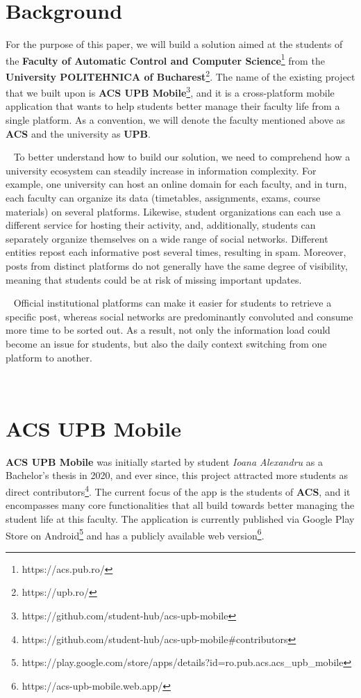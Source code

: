 \section{Background} \label{1:background}

For the purpose of this paper, we will build a solution aimed at the students of the \textbf{Faculty of Automatic Control and Computer Science}\footnote{https://acs.pub.ro/} from the \textbf{University POLITEHNICA of Bucharest}\footnote{https://upb.ro/}. The name of the existing project that we built upon is \textbf{ACS UPB Mobile}\footnote{https://github.com/student-hub/acs-upb-mobile}, and it is a cross-platform mobile application that wants to help students better manage their faculty life from a single platform. As a convention, we will denote the faculty mentioned above as \textbf{ACS} and the university as \textbf{UPB}. 

~
To better understand how to build our solution, we need to comprehend how a university ecosystem can steadily increase in information complexity. For example, one university can host an online domain for each faculty, and in turn, each faculty can organize its data (timetables, assignments, exams, course materials) on several platforms. Likewise, student organizations can each use a different service for hosting their activity, and, additionally, students can separately organize themselves on a wide range of social networks. Different entities repost each informative post several times, resulting in spam. Moreover, posts from distinct platforms do not generally have the same degree of visibility, meaning that students could be at risk of missing important updates.

~
Official institutional platforms can make it easier for students to retrieve a specific post, whereas social networks are predominantly convoluted and consume more time to be sorted out. As a result, not only the information load could become an issue for students, but also the daily context switching from one platform to another.

~

\section{ACS UPB Mobile} \label{1:acs-upb-mobile}

\textbf{ACS UPB Mobile} was initially started by student \textit{Ioana Alexandru} as a Bachelor's thesis \cite{ioana-alexandru-paper} in 2020, and ever since, this project attracted more students as direct contributors\footnote{https://github.com/student-hub/acs-upb-mobile\#contributors}. The current focus of the app is the students of \textbf{ACS}, and it encompasses many core functionalities that all build towards better managing the student life at this faculty. The application is currently published via Google Play Store on Android\footnote{https://play.google.com/store/apps/details?id=ro.pub.acs.acs\_upb\_mobile} and has a publicly available web version\footnote{https://acs-upb-mobile.web.app/}.

